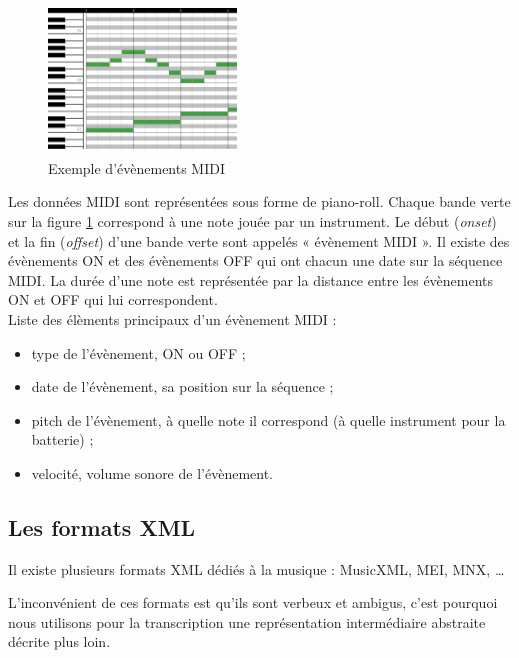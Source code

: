 \begin{figure}[h]
	\centering
	\includegraphics[height=40mm, width=50mm]{
    z_images/1_contexte/2_midi_piano.jpg}
	\caption{Exemple d’évènements MIDI}
	\label{piano_roll}
\end{figure}
Les données MIDI sont représentées sous forme de piano-roll. Chaque bande verte
sur la figure \ref{piano_roll} correspond à une note jouée par un instrument.
Le début (\textit{onset}) et la fin (\textit{offset}) d’une bande verte sont
appelés « évènement MIDI ». Il existe des évènements ON et des évènements OFF
qui ont chacun une date sur la séquence MIDI. La durée d’une note est
représentée par la distance entre les évènements ON et OFF qui lui
correspondent.\\

Liste des élèments principaux d’un évènement MIDI :
\begin{itemize}
    \item type de l’évènement, ON ou OFF ;
    \item date de l’évènement, sa position sur la séquence ;
    \item pitch de l’évènement, à quelle note il correspond (à quelle
        instrument pour la batterie) ;
    \item velocité, volume sonore de l’évènement.\\
\end{itemize}


\subsection*{Les formats XML}
Il existe plusieurs formats XML dédiés à la musique : MusicXML, MEI, MNX, …

L’inconvénient de ces formats est qu’ils sont verbeux et ambigus, c’est
pourquoi nous utilisons pour la transcription une représentation intermédiaire
abstraite décrite plus loin.



